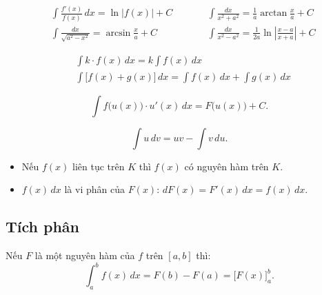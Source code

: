 \documentclass[12pt,a4paper]{article}
\begin{document}
\begin{congthuc}[title={Một số nguyên hàm bổ sung}]
  \begin{align*}
    &\int \frac{f'(x)}{f(x)}\,dx = \ln\bigl|f(x)\bigr| + C
    &\qquad&
    \int \frac{dx}{x^2 + a^2} = \frac{1}{a}\arctan\frac{x}{a} + C \\[6pt]
    &\int \frac{dx}{\sqrt{a^2 - x^2}} = \arcsin\frac{x}{a} + C
    &&
    \int \frac{dx}{x^2 - a^2} = \frac{1}{2a}\ln\left|\frac{x - a}{x + a}\right| + C
  \end{align*}
\end{congthuc}

\begin{tinhchat}
  \begin{align*}
    &\int k \cdot f(x)\,dx = k \int f(x)\,dx \\[4pt]
    &\int \bigl[f(x) + g(x)\bigr]\,dx = \int f(x)\,dx + \int g(x)\,dx
  \end{align*}
\end{tinhchat}

\begin{congthuc}[title={Nguyên hàm hàm hợp}]
  \[
    \int f\bigl(u(x)\bigr) \cdot u'(x)\,dx = F\bigl(u(x)\bigr) + C.
  \]
\end{congthuc}

\begin{congthuc}[title={Nguyên hàm từng phần}]
  \[
    \int u\,dv = uv - \int v\,du.
  \]
\end{congthuc}

\begin{luuy}
  \begin{itemize}
    \item Nếu $f(x)$ liên tục trên $K$ thì $f(x)$ có nguyên hàm trên $K$.
    \item $f(x)\,dx$ là vi phân của $F(x)$: $dF(x) = F'(x)\,dx = f(x)\,dx$.
  \end{itemize}
\end{luuy}

\subsection{Tích phân}

\begin{dinhnghia}
  Nếu $F$ là một nguyên hàm của $f$ trên $[a,b]$ thì:
  \[
    \int_a^b f(x)\,dx = F(b) - F(a) = \bigl[F(x)\bigr]_a^b.
  \]
\end{dinhnghia}
\end{document}
